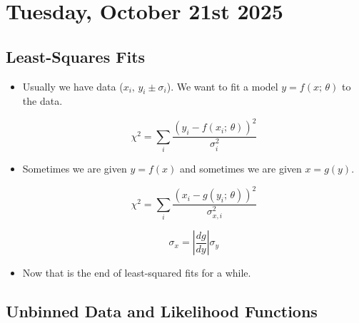 \section{Tuesday, October 21st 2025}

\subsection{Least-Squares Fits}

\begin{itemize}
      \item Usually we have data ($x_i, \, y_i \pm \sigma_i$). We want to fit a model $y = f(x; \, \theta)$ to the data.

            \[ \chi^2 = \sum_i \frac{(y_i - f(x_i; \, \theta))^2}{\sigma_i^2} \]

      \item Sometimes we are given $y = f(x)$ and sometimes we are given $x = g(y)$.

            \[ \chi^2 = \sum_i \frac{(x_i - g(y_i; \, \theta))^2}{\sigma_{x,i}^2} \]

            \[ \sigma_x = \left| \frac{dg}{dy} \right| \sigma_y \]

      \item Now that is the end of least-squared fits for a while.
\end{itemize}

\subsection{Unbinned Data and Likelihood Functions}

